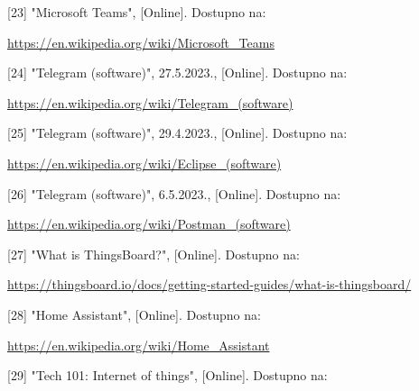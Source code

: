\documentclass[times, utf8, zavrsni]{fer}
\begin{document}
[23] "Microsoft Teams", [Online].
Dostupno na:

\href{https://en.wikipedia.org/wiki/Microsoft_Teams}{https://en.wikipedia.org/wiki/Microsoft\_Teams}

[24] "Telegram (software)", 27.5.2023., [Online].
Dostupno na:

\href{https://en.wikipedia.org/wiki/Telegram_(software)}{https://en.wikipedia.org/wiki/Telegram\_(software)}

[25] "Telegram (software)", 29.4.2023., [Online].
Dostupno na:

\href{https://en.wikipedia.org/wiki/Eclipse_(software)}{https://en.wikipedia.org/wiki/Eclipse\_(software)}

[26] "Telegram (software)", 6.5.2023., [Online].
Dostupno na:

\href{https://en.wikipedia.org/wiki/Postman_(software)}{https://en.wikipedia.org/wiki/Postman\_(software)}

[27] "What is ThingsBoard?", [Online].
Dostupno na:

\href{https://thingsboard.io/docs/getting-started-guides/what-is-thingsboard/}{https://thingsboard.io/docs/getting-started-guides/what-is-thingsboard/}

[28] "Home Assistant", [Online].
Dostupno na:

\href{https://en.wikipedia.org/wiki/Home_Assistant}{https://en.wikipedia.org/wiki/Home_Assistant}


[29] "Tech 101: Internet of things", [Online].
Dostupno na:
\end{document}

